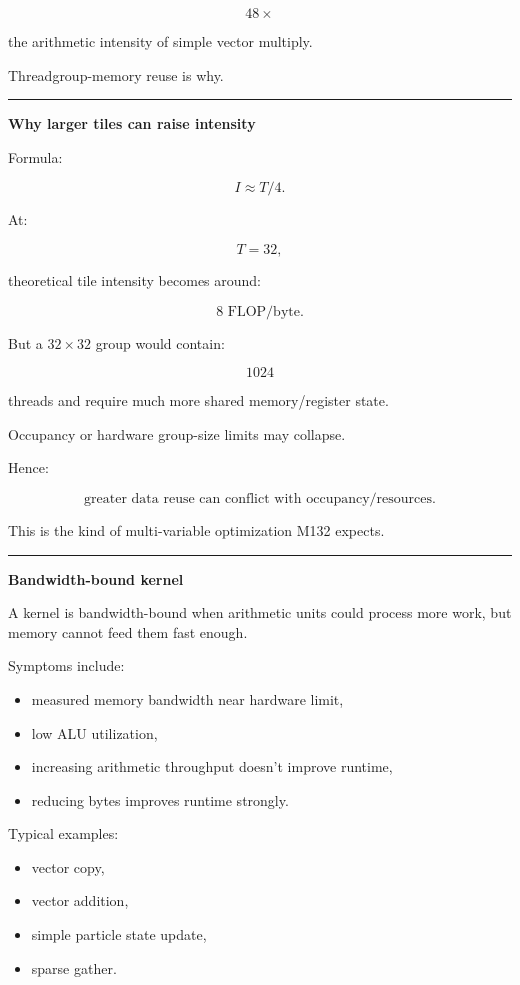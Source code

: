 \[
48\times
\]

the arithmetic intensity of simple vector multiply.

Threadgroup-memory reuse is why.

\begin{center}\rule{0.5\linewidth}{0.5pt}\end{center}

\textbf{Why larger tiles can raise intensity}

Formula:

\[
I\approx T/4.
\]

At:

\[
T=32,
\]

theoretical tile intensity becomes around:

\[
8\text{ FLOP/byte}.
\]

But a \(32\times32\) group would contain:

\[
1024
\]

threads and require much more shared memory/register state.

Occupancy or hardware group-size limits may collapse.

Hence:

\[
\boxed{
\text{greater data reuse can conflict with occupancy/resources}.
}
\]

This is the kind of multi-variable optimization M132 expects.

\begin{center}\rule{0.5\linewidth}{0.5pt}\end{center}

\textbf{Bandwidth-bound kernel}

A kernel is bandwidth-bound when arithmetic units could process more work, but memory cannot feed them fast enough.

Symptoms include:

\begin{itemize}
\tightlist
\item
  measured memory bandwidth near hardware limit,
\item
  low ALU utilization,
\item
  increasing arithmetic throughput doesn't improve runtime,
\item
  reducing bytes improves runtime strongly.
\end{itemize}

Typical examples:

\begin{itemize}
\tightlist
\item
  vector copy,
\item
  vector addition,
\item
  simple particle state update,
\item
  sparse gather.
\end{itemize}

